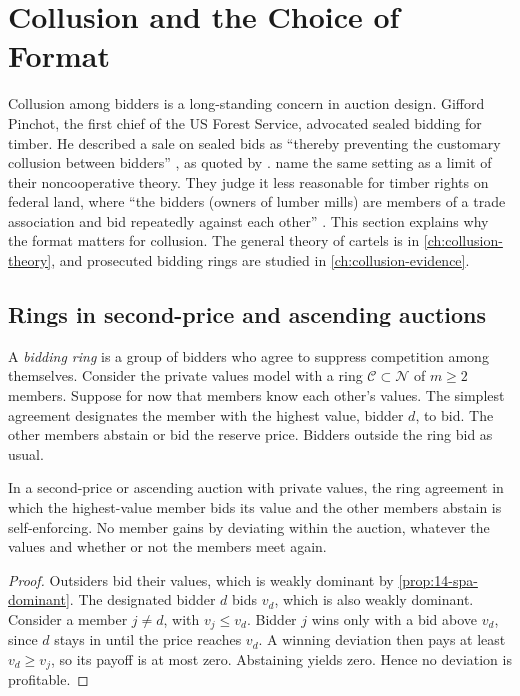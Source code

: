 \section{Collusion and the Choice of Format}\label{sec:14-collusion}

Collusion among bidders is a long-standing concern in auction design. Gifford Pinchot, the first
chief of the US Forest Service, advocated sealed bidding for timber. He described a sale on sealed
bids as ``thereby preventing the customary collusion between bidders'' \citep[p.~209]{Pinchot1998},
as quoted by \citet[footnote 2]{AtheyLevinSeira2011}. \citet[Section 9]{MilgromWeber1982} name the
same setting as a limit of their noncooperative theory. They judge it less reasonable for timber
rights on federal land, where ``the bidders (owners of lumber mills) are members of a trade
association and bid repeatedly against each other'' \citep[p.~1118]{MilgromWeber1982}. This section explains why the format matters for collusion. The
general theory of cartels is in \cref{ch:collusion-theory}, and prosecuted bidding rings are studied
in \cref{ch:collusion-evidence}.

\subsection{Rings in second-price and ascending auctions}\label{sec:14-collusion-open}

A \emph{bidding ring} is a group of bidders who agree to suppress competition among themselves.
Consider the private values model with a ring $\mathcal C\subset\mathcal N$ of $m\ge 2$ members.
Suppose for now that members know each other's values. The simplest agreement designates the member
with the highest value, bidder $d$, to bid. The other members abstain or bid the reserve price.
Bidders outside the ring bid as usual.

\begin{proposition}[Robinson 1985]\label{prop:14-robinson}
In a second-price or ascending auction with private values, the ring agreement in which the
highest-value member bids its value and the other members abstain is self-enforcing. No member gains
by deviating within the auction, whatever the values and whether or not the members meet again.
\end{proposition}

\begin{proof}
Outsiders bid their values, which is weakly dominant by \cref{prop:14-spa-dominant}. The designated
bidder $d$ bids $v_d$, which is also weakly dominant. Consider a member $j\neq d$, with $v_j\le v_d$.
Bidder $j$ wins only with a bid above $v_d$, since $d$ stays in until the price reaches $v_d$. A
winning deviation then pays at least $v_d\ge v_j$, so its payoff is at most zero. Abstaining yields
zero. Hence no deviation is profitable.
\end{proof}

